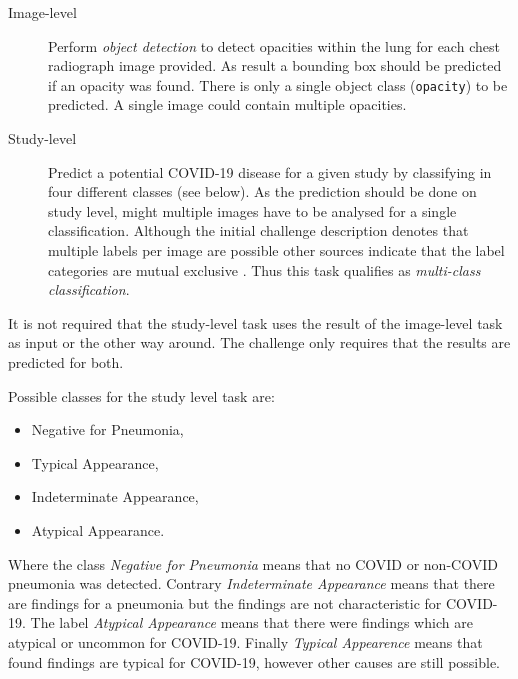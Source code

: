 \begin{description}
    \item[Image-level] Perform \textit{object detection} to detect opacities within the lung for each chest radiograph image provided. As result a bounding box should be predicted if an opacity was found. There is only a single object class (\texttt{opacity}) to be predicted. A single image could contain multiple opacities.
    \item[Study-level] Predict a potential COVID-19 disease for a given study by classifying in four different classes (see below). As the prediction should be done on study level, might multiple images have to be analysed for a single classification. Although the initial challenge description denotes that multiple labels per image are possible other sources indicate that the label categories are mutual exclusive \autocite{litmanovich2020review, SIIMKaggleAnnotation}. Thus this task qualifies as \textit{multi-class classification}.
\end{description}

It is not required that the study-level task uses the result of the image-level task as input or the other way around. The challenge only requires that the results are predicted for both.

Possible classes for the study level task are:

\begin{itemize}
    \item Negative for Pneumonia,
    \item Typical Appearance,
    \item Indeterminate Appearance,
    \item Atypical Appearance.
\end{itemize}

Where the class \textit{Negative for Pneumonia} means that no COVID or non-COVID pneumonia was detected. Contrary \textit{Indeterminate Appearance} means that there are findings for a pneumonia but the findings are not characteristic for COVID-19. The label \textit{Atypical Appearance} means that there were findings which are atypical or uncommon for COVID-19. Finally \textit{Typical Appearence} means that found findings are typical for COVID-19, however other causes are still possible.

